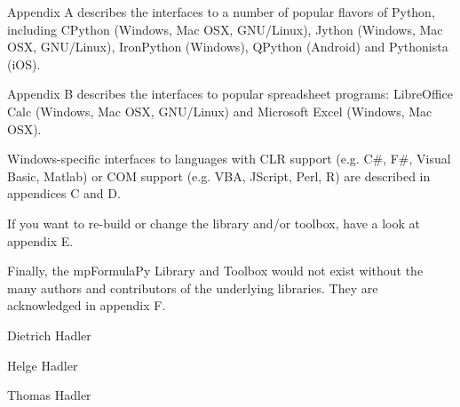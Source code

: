 \vpara
Appendix A describes the interfaces to a number of popular flavors of Python, including CPython (Windows, Mac OSX, GNU/Linux), Jython (Windows, Mac OSX, GNU/Linux), IronPython (Windows), QPython (Android) and Pythonista (iOS).

\vpara
Appendix B describes the interfaces to popular spreadsheet programs: LibreOffice Calc (Windows, Mac OSX, GNU/Linux) and Microsoft Excel (Windows, Mac OSX).

\vpara
Windows-specific interfaces to languages with CLR support (e.g. C\#, F\#, Visual Basic, Matlab) or COM support (e.g. VBA, JScript, Perl, R) are described in appendices C and D.

\vpara
If you want to re-build or change the library and/or toolbox, have a look at appendix E.

\vpara
Finally, the mpFormulaPy Library and Toolbox would not exist without the many authors and contributors of the underlying libraries. They are acknowledged in appendix F.


\vspace{0.6cm}
Dietrich Hadler

Helge Hadler

Thomas Hadler

